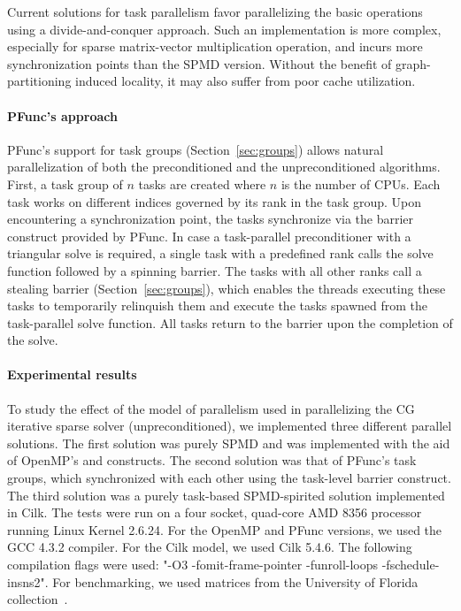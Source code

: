 \documentclass{sig-alternate}
\begin{document}
Current solutions for task parallelism favor parallelizing the basic
operations using a divide-and-conquer approach.  Such an implementation is
more complex, especially for sparse matrix-vector multiplication
operation, and incurs more synchronization points than the SPMD version.
Without the benefit of graph-partitioning induced
locality, it may also suffer from poor cache utilization.

\paragraph{PFunc's approach}
PFunc's support for task groups (Section~\ref{sec:groups}) allows natural
parallelization of both the preconditioned and the unpreconditioned algorithms.
First, a task group of $n$ tasks are created where $n$ is the number of CPUs.
Each task works on different indices governed by its rank in the task group.
Upon encountering a synchronization point, the tasks synchronize via the
barrier construct provided by PFunc.  In case a task-parallel preconditioner
with a triangular solve is required, a single task with a predefined rank calls the solve
function followed by a spinning barrier.  The tasks with all other ranks call a
stealing barrier (Section~\ref{sec:groups}), which enables the threads
executing these tasks to temporarily relinquish them and execute the tasks
spawned from the task-parallel solve function.  All tasks return to the barrier
upon the completion of the solve.

\paragraph{Experimental results}
To study the effect of the model of parallelism used in parallelizing the CG
iterative sparse solver (unpreconditioned), we implemented three different
parallel solutions. The first solution was purely SPMD and was implemented with
the aid of OpenMP's  and  constructs. The second
solution was that of PFunc's task groups, which synchronized with each other
using the task-level barrier construct.  The third solution was a purely
task-based SPMD-spirited solution implemented in Cilk.  The tests were run on a
four socket, quad-core AMD 8356 processor running Linux Kernel 2.6.24.  For the
OpenMP and PFunc versions, we used the GCC 4.3.2 compiler. For the Cilk model,
we used Cilk 5.4.6. The following compilation flags were used: "-O3
-fomit-frame-pointer -funroll-loops -fschedule-insns2".  For benchmarking, we
used matrices from the University of Florida collection~\cite{davissparse}.
\end{document}
